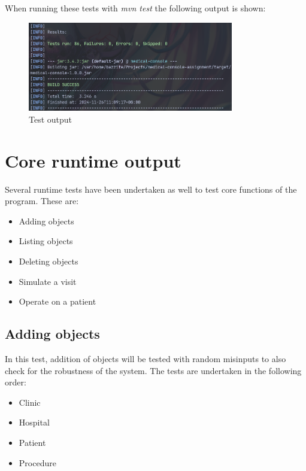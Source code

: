 \documentclass{article}
\begin{document}
	When running these tests with \textit{mvn test} the following output is shown:
	\begin{figure}
		\begin{center}
			\includegraphics[width=0.8\textwidth]{figures/Mvn_test.png}
		\end{center}
		\caption{Test output}\label{fig:}
	\end{figure}
	

	\newpage

	\section{Core runtime output}\label{sec:runtime_output} %
	Several runtime tests have been undertaken as well to test core functions of the program. These are:
	\begin{itemize}
		\item Adding objects
		\item Listing objects
		\item Deleting objects
		\item Simulate a visit
		\item Operate on a patient
	\end{itemize}

	\subsection{Adding objects}\label{sub:adding_objects} %
	In this test, addition of objects will be tested with random misinputs to also check for the robustness of the system. The tests are undertaken in the following order: 
	\begin{itemize}
		\item Clinic 
		\item Hospital 
		\item Patient
		\item Procedure
	\end{itemize}
\end{document}
